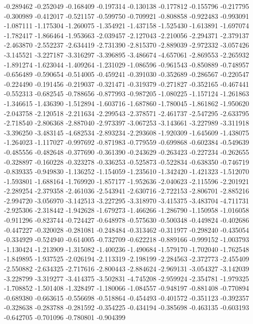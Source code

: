 -0.289462
-0.252049
-0.168409
-0.197314
-0.130138
-0.177812
-0.155796
-0.217795
-0.300989
-0.412017
-0.521157
-0.599750
-0.709921
-0.808858
-0.922483
-0.993091
-1.087111
-1.175304
-1.260075
-1.354921
-1.437158
-1.525430
-1.613891
-1.697074
-1.782417
-1.866464
-1.953663
-2.039457
-2.127043
-2.210056
-2.294371
-2.379137
-2.463870
-2.552237
-2.634419
-2.731390
-2.815370
-2.889039
-2.972332
-3.057426
-3.145521
-3.227187
-3.316297
-3.396895
-3.486674
-4.657061
-2.869553
-2.265932
-1.891274
-1.623044
-1.409264
-1.231029
-1.086596
-0.961543
-0.850889
-0.748957
-0.656489
-0.590654
-0.514005
-0.459241
-0.391030
-0.352689
-0.286567
-0.220547
-0.224490
-0.191456
-0.219037
-0.321471
-0.319379
-0.271827
-0.352165
-0.467441
-0.552313
-0.682545
-0.788656
-0.877993
-0.987205
-1.080225
-1.157124
-1.261863
-1.346615
-1.436390
-1.512894
-1.603716
-1.687860
-1.780045
-1.861862
-1.950620
-2.043758
-2.120518
-2.211634
-2.299543
-2.378571
-2.461737
-2.547295
-2.633795
-2.718540
-2.806368
-2.887040
-2.973397
-3.067253
-3.143661
-3.227989
-3.311918
-3.396250
-3.483145
-4.682534
-2.893234
-2.293608
-1.920309
-1.645609
-1.438075
-1.264023
-1.117027
-0.997692
-0.871983
-0.779559
-0.699868
-0.602384
-0.549639
-0.485556
-0.482648
-0.377690
-0.361390
-0.243629
-0.263423
-0.227234
-0.262655
-0.328897
-0.160228
-0.323278
-0.336253
-0.525873
-0.522834
-0.638350
-0.746719
-0.839335
-0.949830
-1.136252
-1.154059
-1.235610
-1.342420
-1.421323
-1.512070
-1.593801
-1.688164
-1.769920
-1.857177
-1.952636
-2.040623
-2.115596
-2.201921
-2.289254
-2.379358
-2.461036
-2.543941
-2.630716
-2.722153
-2.806701
-2.885216
-2.994720
-3.056970
-3.142513
-3.227295
-3.318970
-3.415375
-3.483704
-4.711731
-2.925306
-2.318442
-1.942628
-1.679273
-1.466266
-1.286790
-1.150958
-1.016058
-0.911296
-0.823744
-0.724427
-0.648978
-0.575630
-0.500348
-0.449824
-0.402686
-0.447227
-0.320028
-0.281081
-0.248484
-0.313462
-0.311977
-0.298240
-0.435054
-0.334929
-0.524940
-0.614005
-0.732709
-0.622218
-0.889166
-0.999152
-1.003793
-1.130424
-1.213909
-1.315082
-1.400236
-1.490684
-1.579170
-1.702040
-1.762548
-1.849895
-1.937525
-2.026194
-2.113319
-2.198199
-2.284563
-2.372773
-2.455409
-2.550882
-2.634325
-2.717616
-2.800443
-2.884624
-2.969131
-3.054327
-3.142039
-3.228799
-3.319277
-3.414375
-3.502831
-4.745208
-2.959924
-2.354781
-1.979325
-1.708852
-1.501408
-1.328497
-1.180066
-1.084557
-0.948197
-0.881408
-0.770894
-0.689380
-0.663615
-0.556698
-0.518864
-0.454493
-0.401572
-0.351123
-0.392357
-0.328638
-0.283788
-0.281592
-0.354225
-0.434194
-0.385698
-0.463135
-0.603193
-0.642705
-0.701096
-0.780801
-0.904399
